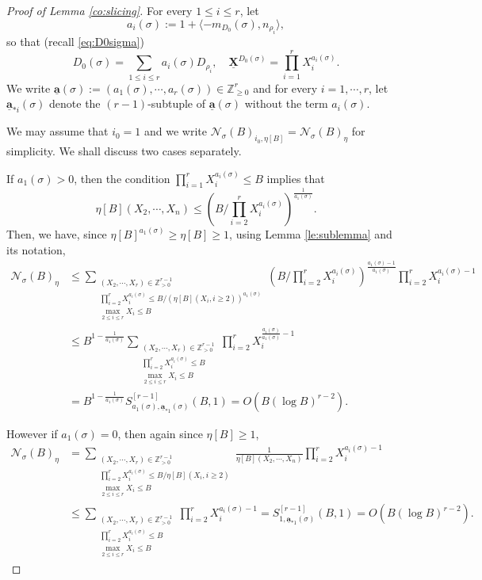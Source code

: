 \documentclass[11pt,letterpaper]{amsart}
\newcommand{\BZ}{{\mathbb {Z}}}
\newcommand{\CN}{{\mathcal {N}}}
\newcommand{\XX}{\underline{\mathbf{X}}}
\renewcommand{\aa}{\underline{\mathbf{a}}}
\theoremstyle{plain}
\numberwithin{equation}{section}
\theoremstyle{definition}
\theoremstyle{remark}
\begin{document}
\begin{proof}[Proof of Lemma \ref{co:slicing}]
	
	For every $1\leqslant i\leqslant r$, let
	\begin{equation}\label{eq:arhosigma}
		a_i(\sigma):=1+\langle -m_{D_0}(\sigma),n_{\rho_i}\rangle,
	\end{equation} so that (recall \eqref{eq:D0sigma}) $$D_0(\sigma)=\sum_{1\leqslant i\leqslant r}a_{i}(\sigma)D_{\rho_i},\quad \XX^{D_0(\sigma)}=\prod_{i=1}^{r}X_i^{a_i(\sigma)}.$$ 
	We write $\aa(\sigma):=(a_1(\sigma),\cdots,a_r(\sigma))\in\BZ_{\geqslant 0}^r$ and for every $i=1,\cdots,r$, let $\aa_{*i}(\sigma)$ denote the $(r-1)$-subtuple of $\aa(\sigma)$ without the term $a_{i}(\sigma)$.
	
	We may assume that $i_0=1$ and we write $\CN_\sigma(B)_{i_0,\eta[B]}=\CN_\sigma(B)_{\eta}$ for simplicity. We shall discuss two cases separately. 
	
	If $a_1(\sigma)>0$, then the condition $\prod_{i=1}^r X_i^{a_i(\sigma)}\leqslant B$ implies that $$\eta[B](X_2,\cdots,X_n)\leqslant \left(B/\prod_{i=2}^{r} X_i^{a_i(\sigma)}\right)^{\frac{1}{a_1(\sigma)}}.$$ 
	Then, we have, since $\eta[B]^{a_1(\sigma)}\geqslant\eta[B]\geqslant 1$, using Lemma \ref{le:sublemma} and its notation,
	\begin{align*}
		\CN_\sigma(B)_{\eta} &\leqslant \sum_{\substack{(X_2,\cdots,X_r)\in\BZ_{>0}^{r-1}\\ \prod_{i=2}^r X_i^{a_i(\sigma)}\leqslant B/(\eta[B](X_i,i\geqslant 2))^{a_1(\sigma)}\\\max_{2\leqslant i\leqslant r} X_i\leqslant B}}\left(B/\prod_{i=2}^r X_i^{a_i(\sigma)}\right)^{\frac{a_1(\sigma)-1}{a_1(\sigma)}} \prod_{i=2}^r X_i^{a_i(\sigma)-1}\\ &\leqslant B^{1-\frac{1}{a_1(\sigma)}}\sum_{\substack{(X_2,\cdots,X_r)\in\BZ_{>0}^{r-1}\\ \prod_{i=2}^r X_i^{a_i(\sigma)}\leqslant B\\ \max_{2\leqslant i\leqslant r} X_i\leqslant B}}\prod_{i=2}^{r}X_i^{\frac{a_i(\sigma)}{a_1(\sigma)}-1}\\ &=B^{1-\frac{1}{a_1(\sigma)}}S^{[r-1]}_{a_1(\sigma),\aa_{*1}(\sigma)}(B,1)=O(B(\log B)^{r-2}).
	\end{align*}
	
	However if $a_1(\sigma)=0$, then again since $\eta[B]\geqslant 1$,
	\begin{align*}
		\CN_\sigma(B)_{\eta}&=\sum_{\substack{(X_2,\cdots,X_r)\in\BZ_{>0}^{r-1}\\ \prod_{i=2}^r X_i^{a_i(\sigma)}\leqslant B/\eta[B](X_i,i\geqslant 2)\\\max_{2\leqslant i\leqslant r} X_i\leqslant B}}\frac{1}{\eta[B](X_2,\cdots,X_n)}\prod_{i=2}^r X_i^{a_i(\sigma)-1}\\ &\leqslant \sum_{\substack{(X_2,\cdots,X_r)\in\BZ_{>0}^{r-1}\\ \prod_{i=2}^r X_i^{a_i(\sigma)}\leqslant B\\\max_{2\leqslant i\leqslant r} X_i\leqslant B}}\prod_{i=2}^r X_i^{a_i(\sigma)-1}= S^{[r-1]}_{1,\aa_{*1}(\sigma)}(B,1)=O(B(\log B)^{r-2}).
	\end{align*} 
	

\end{proof}
\end{document}
